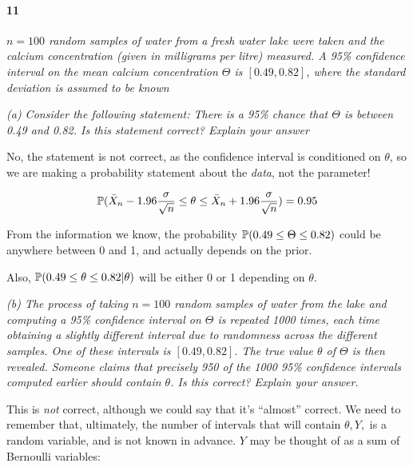 \documentclass[a4paper]{article}
\begin{document}
            \paragraph{11}
            \textit{$n = 100$ random samples of water from a fresh water lake
            were taken and the calcium concentration (given in milligrams per
            litre) measured. A 95\% confidence interval on the mean calcium
            concentration $\Theta$ is $[0.49, 0.82]$, where the standard
            deviation is assumed to be known}

            \textit{(a) Consider the following statement: There is a 95\% chance
            that $\Theta$ is between 0.49 and 0.82. Is this statement correct?
            Explain your answer}

                No, the statement is not correct, as the confidence interval is
                conditioned on $\theta$, so we are making a probability
                statement about the \textit{data}, not the parameter!

                \[
                    \mathbb{P}(\bar X_n - 1.96 \frac{\sigma}{\sqrt{n}} \leq \theta
                    \leq \bar X_n + 1.96 \frac{\sigma}{\sqrt{n}}) = 0.95
                \]

                From the information we know, the probability $\mathbb{P}(0.49 \leq
                \Theta \leq 0.82)$ could be anywhere between 0 and 1, and
                actually depends on the prior.

                Also, $\mathbb{P}(0.49 \leq \theta \leq 0.82 | \theta)$ will be
                either 0 or 1 depending on $\theta$.

            \textit{(b) The process of taking $n = 100$ random samples of water
            from the lake and computing a 95\% confidence interval on $\Theta$
            is repeated 1000 times, each time obtaining a slightly different
            interval due to randomness across the different samples. One of
            these intervals is $[0.49, 0.82]$. The true value $\theta$ of
            $\Theta$ is then revealed. Someone claims that precisely 950 of the
            1000 95\% confidence intervals computed earlier should contain
            $\theta$. Is this correct? Explain your answer.}

                This is \textit{not} correct, although we could say that it's
                ``almost'' correct. We need to remember that, ultimately, the
                number of intervals that will contain $\theta, Y,$ is a random
                variable, and is not known in advance. $Y$ may be thought of as
                a sum of Bernoulli variables:
\end{document}
